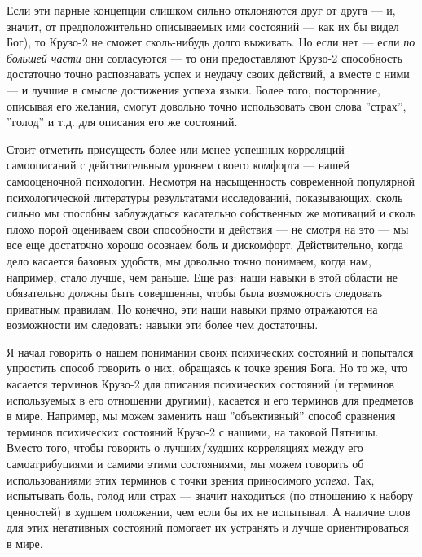 \documentclass[11pt]{book}
\begin{document}
Если эти парные концепции слишком сильно отклоняются друг от друга --- и, значит, от предположительно описываемых ими состояний --- как их бы видел Бог), то Крузо-2 не сможет сколь-нибудь долго выживать. Но если нет --- если \textit{по большей части} они согласуются --- то они предоставляют Крузо-2 способность достаточно точно распознавать успех и неудачу своих действий, а вместе с ними --- и лучшие в смысле достижения успеха языки. Более того, посторонние, описывая его желания, смогут довольно точно использовать свои слова ''страх'', ''голод'' и т.д. для описания его же состояний.

Стоит отметить присущесть более или менее успешных корреляций самоописаний с действительным уровнем своего комфорта --- нашей самооценочной психологии. Несмотря на насыщенность современной популярной психологической литературы результатами исследований, показывающих, сколь сильно мы способны заблуждаться касательно собственных же мотиваций и сколь плохо порой оцениваем свои способности и действия --- не смотря на это --- мы все еще достаточно хорошо осознаем боль и дискомфорт. Действительно, когда дело касается базовых удобств, мы довольно точно понимаем, когда нам, например, стало лучше, чем раньше. Еще раз: наши навыки в этой области не обязательно должны быть совершенны, чтобы была возможность следовать приватным правилам. Но конечно, эти наши навыки прямо отражаются на возможности им следовать: навыки эти более чем достаточны.

Я начал говорить о нашем понимании своих психических состояний и попытался упростить способ говорить о них, обращаясь к точке зрения Бога. Но то же, что касается терминов Крузо-2 для описания психических состояний (и терминов используемых в его отношении другими), касается и его терминов для предметов в мире. Например, мы можем заменить наш ''объективный'' способ сравнения терминов психических состояний Крузо-2 с нашими, на таковой Пятницы. Вместо того, чтобы говорить о лучших/худших корреляциях между его самоатрибуциями и самими этими состояниями, мы можем говорить об использованиями этих терминов с точки зрения приносимого \textit{успеха}. Так, испытывать боль, голод или страх --- значит находиться (по отношению к набору ценностей) в худшем положении, чем если бы их не испытывал. А наличие слов для этих негативных состояний помогает их устранять и лучше ориентироваться в мире.
\end{document}

